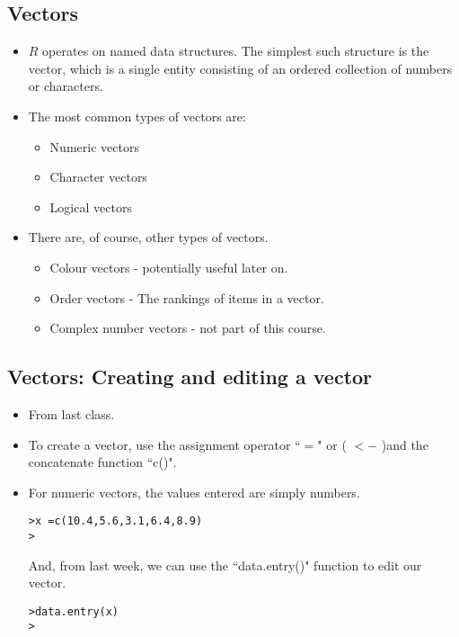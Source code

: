 

\subsection{Vectors}
\begin{itemize}
\item $R$ operates on named data structures. The simplest such
structure is the vector, which is a single entity consisting of an
ordered collection of numbers or characters.

\item The most common types of vectors are:
\begin{itemize}
\item Numeric vectors \item Character vectors \item Logical
vectors
\end{itemize}

\item There are, of course, other types of vectors.
\begin{itemize}
\item Colour vectors - potentially useful later on.
\item Order vectors - The rankings of items in a vector.
\item Complex number vectors - not part of this course.
\end{itemize}
\end{itemize}

\subsection{Vectors: Creating and editing a vector}
\begin{itemize}
\item From last class.
\item To create a vector, use the assignment operator ``$=$" or ( $<-$ )and
the concatenate function ``c()". \item For numeric vectors, the values
entered are simply numbers.

\begin{verbatim}
>x =c(10.4,5.6,3.1,6.4,8.9)
>
\end{verbatim}

And, from last week, we can use the ``data.entry()" function to edit our vector.
\begin{verbatim}
>data.entry(x)
>
\end{verbatim}
\end{itemize}




